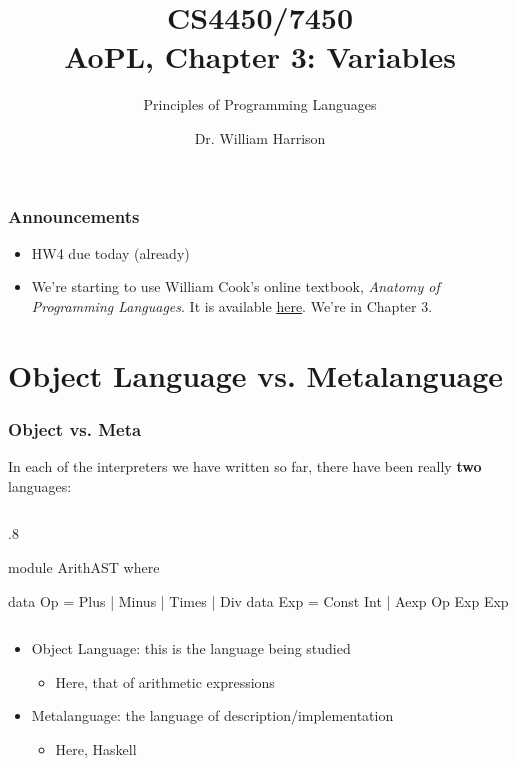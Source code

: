 \documentclass{beamer}
\title[CS4450]{CS4450/7450\\AoPL, Chapter 3: Variables}
\subtitle{Principles of Programming Languages}
\author[Bill Harrison]{Dr. William Harrison}
\institute{University of Missouri}
\newenvironment{codeblock}[1][.8]{%
\begin{columns}
\begin{column}{#1\linewidth}
\begin{exampleblock}{}}{%
\end{exampleblock}
\end{column}
\end{columns}}
\begin{document}
\frame{\titlepage}

\begin{frame}[fragile]
\frametitle{Announcements}

\begin{itemize}
\item HW4 due today (already)

\item We're starting to use William Cook's online textbook, \emph{Anatomy of Programming Languages}. It is available
\href{https://www.cs.utexas.edu/~wcook/anatomy/}{here}. We're in Chapter 3.
\end{itemize}

\end{frame}


\section{Object Language vs. Metalanguage}


\begin{frame}[fragile]
\frametitle{Object vs. Meta}

In each of the interpreters we have written so far, there have been really {\bf two} languages:
\begin{codeblock}
\begin{hcode}
module ArithAST where

data Op    = Plus | Minus | Times | Div 
data Exp   = Const Int | Aexp Op Exp Exp 
\end{hcode}
\end{codeblock}

\pause
\begin{itemize}
\item Object Language: this is the language being studied
\begin{itemize}
\item Here, that of arithmetic expressions
\end{itemize}
\item Metalanguage: the language of description/implementation
\begin{itemize}
\item Here, Haskell
\end{itemize}
\end{itemize}

\end{frame}
\end{document}
